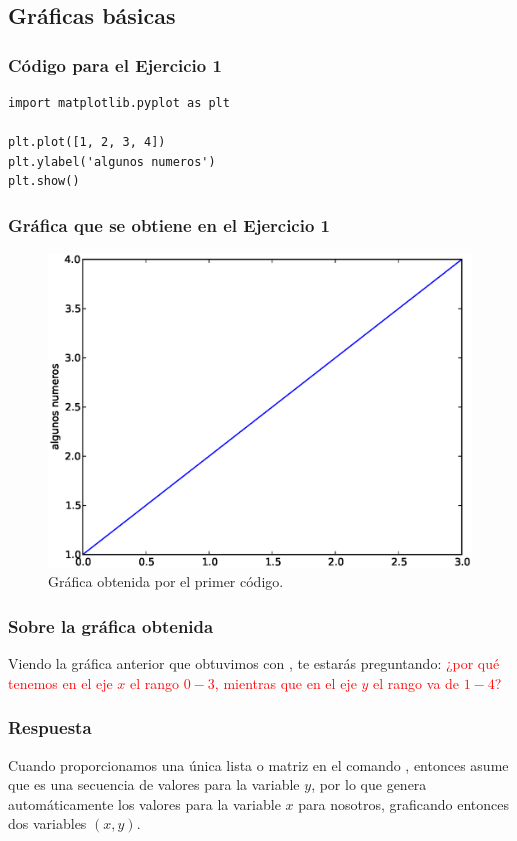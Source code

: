 \subsection{Gráficas básicas}
\begin{frame}[fragile]
\frametitle{Código para el Ejercicio 1}
\begin{lstlisting}[style=codigopython, caption=Gráfica básica]
import matplotlib.pyplot as plt

plt.plot([1, 2, 3, 4])
plt.ylabel('algunos numeros')
plt.show()
\end{lstlisting}
\end{frame}
\begin{frame}[fragile]
\frametitle{Gráfica que se obtiene en el Ejercicio 1}
\begin{figure}
	\centering
	\includegraphics[scale=0.35]{Imagenes/plotEjercicio1.eps}
	\caption{Gráfica obtenida por el primer código.}
\end{figure}
\end{frame}
\begin{frame}[fragile]
\frametitle{Sobre la gráfica obtenida}
Viendo la gráfica anterior que obtuvimos con , te estarás preguntando: \textcolor{red}{ ¿por qué tenemos en el eje $x$ el rango $0-3$, mientras que en el eje $y$ el rango va de  $1-4$?}
\end{frame}
\begin{frame}
\frametitle{Respuesta}
Cuando proporcionamos una única lista o matriz en el comando , entonces  asume que es una secuencia de valores para la variable $y$, por lo que genera automáticamente los valores para la variable $x$ para nosotros, graficando entonces dos variables $(x, y)$. 
\end{frame}
